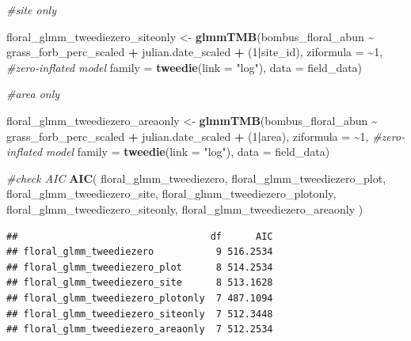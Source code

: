 \documentclass[
]{article}
\newenvironment{Shaded}{\begin{snugshade}}{\end{snugshade}}
\newcommand{\AttributeTok}[1]{\textcolor[rgb]{0.13,0.29,0.53}{#1}}
\newcommand{\CommentTok}[1]{\textcolor[rgb]{0.56,0.35,0.01}{\textit{#1}}}
\newcommand{\DecValTok}[1]{\textcolor[rgb]{0.00,0.00,0.81}{#1}}
\newcommand{\FunctionTok}[1]{\textcolor[rgb]{0.13,0.29,0.53}{\textbf{#1}}}
\newcommand{\NormalTok}[1]{#1}
\newcommand{\OtherTok}[1]{\textcolor[rgb]{0.56,0.35,0.01}{#1}}
\newcommand{\SpecialCharTok}[1]{\textcolor[rgb]{0.81,0.36,0.00}{\textbf{#1}}}
\newcommand{\StringTok}[1]{\textcolor[rgb]{0.31,0.60,0.02}{#1}}
\begin{document}
\begin{Shaded}
\begin{Highlighting}[]
\CommentTok{\#site only}

\NormalTok{floral\_glmm\_tweediezero\_siteonly }\OtherTok{\textless{}{-}} \FunctionTok{glmmTMB}\NormalTok{(bombus\_floral\_abun }\SpecialCharTok{\textasciitilde{}}\NormalTok{ grass\_forb\_perc\_scaled }\SpecialCharTok{+} 
\NormalTok{                    julian.date\_scaled }\SpecialCharTok{+}\NormalTok{ (}\DecValTok{1}\SpecialCharTok{|}\NormalTok{site\_id), }
                    \AttributeTok{ziformula =} \SpecialCharTok{\textasciitilde{}}\DecValTok{1}\NormalTok{, }\CommentTok{\#zero{-}inflated model}
                  \AttributeTok{family =} \FunctionTok{tweedie}\NormalTok{(}\AttributeTok{link =} \StringTok{"log"}\NormalTok{), }
                  \AttributeTok{data =}\NormalTok{ field\_data)}

\CommentTok{\#area only}

\NormalTok{floral\_glmm\_tweediezero\_areaonly }\OtherTok{\textless{}{-}} \FunctionTok{glmmTMB}\NormalTok{(bombus\_floral\_abun }\SpecialCharTok{\textasciitilde{}}\NormalTok{ grass\_forb\_perc\_scaled }\SpecialCharTok{+} 
\NormalTok{                    julian.date\_scaled }\SpecialCharTok{+}\NormalTok{ (}\DecValTok{1}\SpecialCharTok{|}\NormalTok{area), }
                    \AttributeTok{ziformula =} \SpecialCharTok{\textasciitilde{}}\DecValTok{1}\NormalTok{, }\CommentTok{\#zero{-}inflated model}
                  \AttributeTok{family =} \FunctionTok{tweedie}\NormalTok{(}\AttributeTok{link =} \StringTok{"log"}\NormalTok{), }
                  \AttributeTok{data =}\NormalTok{ field\_data)}

\CommentTok{\#check AIC}
\FunctionTok{AIC}\NormalTok{(}
\NormalTok{  floral\_glmm\_tweediezero, }
\NormalTok{  floral\_glmm\_tweediezero\_plot,}
\NormalTok{  floral\_glmm\_tweediezero\_site,}
\NormalTok{  floral\_glmm\_tweediezero\_plotonly, }
\NormalTok{  floral\_glmm\_tweediezero\_siteonly, }
\NormalTok{  floral\_glmm\_tweediezero\_areaonly}
\NormalTok{)}
\end{Highlighting}
\end{Shaded}

\begin{verbatim}
##                                  df      AIC
## floral_glmm_tweediezero           9 516.2534
## floral_glmm_tweediezero_plot      8 514.2534
## floral_glmm_tweediezero_site      8 513.1628
## floral_glmm_tweediezero_plotonly  7 487.1094
## floral_glmm_tweediezero_siteonly  7 512.3448
## floral_glmm_tweediezero_areaonly  7 512.2534
\end{verbatim}
\end{document}
